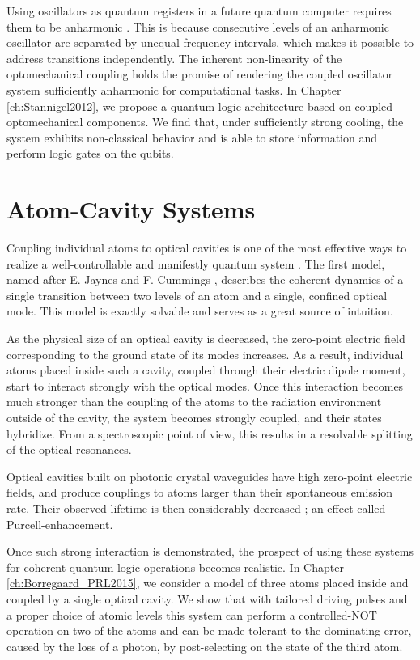 Using oscillators as quantum registers in a future quantum computer requires
them to be anharmonic \cite{Majer2007}. This is because consecutive levels of an
anharmonic oscillator are separated by unequal frequency intervals, which makes
it possible to address transitions independently. The inherent
non-linearity of the optomechanical coupling holds the promise of rendering the
coupled oscillator system sufficiently anharmonic for computational tasks. In
Chapter \ref{ch:Stannigel2012}, we propose a quantum logic architecture based on
coupled optomechanical components. We find that, under sufficiently strong
cooling, the system exhibits non-classical behavior and is able to store
information and perform logic gates on the qubits.






\section{Atom-Cavity Systems}
Coupling individual atoms to optical cavities is one of the most effective ways
to realize a well-controllable and manifestly quantum system \cite{Mabuchi2002,
Walther2006}.
The first model, named after E. Jaynes and F. Cummings \cite{Jaynes1963,
Shore1993}, describes the coherent dynamics of a single transition between two
levels of an atom and a single, confined optical mode. This model is exactly
solvable and serves as a great source of intuition.

As the physical size of an optical cavity is decreased, the zero-point
electric field corresponding to the ground state of its modes increases.
As a result, individual atoms placed inside such a cavity, coupled through their
electric dipole moment, start to interact strongly with the optical modes. Once
this interaction becomes much stronger than the coupling of the atoms to the
radiation environment outside of the cavity, the system becomes strongly coupled, and
their states hybridize. From a spectroscopic point of view, this results in a
resolvable splitting of the optical resonances.

Optical cavities built on photonic crystal waveguides \cite{Tiecke} have
high zero-point electric fields, and produce couplings
to atoms larger than their spontaneous emission rate. Their
observed lifetime is then considerably decreased \cite{Englund2005}; an effect
called Purcell-enhancement.

Once such strong interaction is demonstrated, the prospect of using these
systems for coherent quantum logic operations becomes realistic. In Chapter
\ref{ch:Borregaard_PRL2015}, we consider a model of three atoms placed inside
and coupled by a single optical cavity. We show that with tailored driving pulses
and a proper choice of atomic levels this system can perform a controlled-NOT
operation on two of the atoms and can be made tolerant to the dominating error,
caused by the loss of a photon, by post-selecting on the state of the third
atom.

